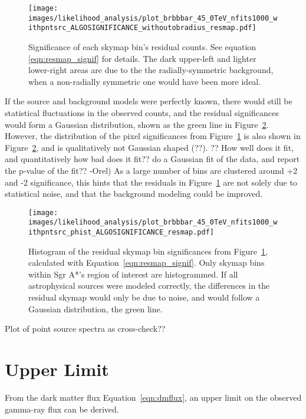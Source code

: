   \begin{figure}[ht]
    \centering
    \texttt{[image: images/likelihood\_analysis/plot\_brbbbar\_45\_0TeV\_nfits1000\_withpntsrc\_ALGOSIGNIFICANCE\_withoutobradius\_resmap.pdf]}
    \caption[Galactic Center Residual Map]
    {
      Significance of each skymap bin's residual counts.
      See equation \ref{eqn:resmap_signif} for details.
      The dark upper-left and lighter lower-right areas are due to the the radially-symmetric background, when a non-radially symmetric one would have been more ideal.
    }
    \label{fig:gc_resmap}
  \end{figure}

  If the source and background models were perfectly known, there would still be statistical fluctuations in the observed counts, and the residual significances would form a Gaussian distribution, shown as the green line in Figure~\ref{fig:gc_resmap_sighist}.
  However, the distribution of the pixel significances from Figure~\ref{fig:gc_resmap} is also shown in Figure~\ref{fig:gc_resmap_sighist}, and is qualitatively not Gaussian shaped {\color{red}(??)}.
  {\color{red}?? How well does it fit, and quantitatively how bad does it fit??}
  {\color{red}do a Gaussian fit of the data, and report the p-value of the fit?? -Orel)}
  As a large number of bins are clustered around +2 and -2 significance, this hints that the residuals in Figure~\ref{fig:gc_resmap} are not solely due to statistical noise, and that the background modeling could be improved.
  
  \begin{figure}[ht]
    \centering
    \texttt{[image: images/likelihood\_analysis/plot\_brbbbar\_45\_0TeV\_nfits1000\_withpntsrc\_phist\_ALGOSIGNIFICANCE\_resmap.pdf]}
    \caption[Galactic Center Residual Histogram]
    {
      Histogram of the residual skymap bin significances from Figure~\ref{fig:gc_resmap}, calculated with Equation~\ref{eqn:resmap_signif}.
      Only skymap bins within Sgr A*'s region of interest are histogrammed.
      If all astrophysical sources were modeled correctly, the differences in the residual skymap would only be due to noise, and would follow a Gaussian distribution, the green line.
    }
    \label{fig:gc_resmap_sighist}
  \end{figure}

  {\color{red}Plot of point source spectra as cross-check??}
  
\section{Upper Limit}\label{upper_limit}
  From the dark matter flux Equation~\ref{eqn:dmflux}, an upper limit on the observed gamma-ray flux can be derived.

